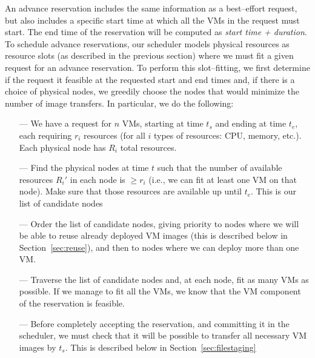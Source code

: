 An advance reservation includes the same information as a best--effort request, but also includes a specific start time at which all the VMs in the request must start. The end time of the reservation will be computed as \emph{start time + duration}. To schedule advance reservations, our scheduler models physical resources as resource slots (as described in the previous section) where we must fit a given request for an advance reservation. To perform this slot--fitting, we first determine if the request it feasible at the requested start and end times and, if there is a choice of physical nodes, we greedily choose the nodes that would minimize the number of image transfers. In particular, we do the following:

\begin{itemize}
\item[---] We have a request for $n$ VMs, starting at time $t_s$ and ending at time $t_e$, each requiring $r_i$ resources (for all $i$ types of resources: CPU, memory, etc.). Each physical node has $R_i$ total resources.
\item[---] Find the physical nodes at time $t$ such that the number of available resources $R_i'$ in each node is $\geqslant r_i$ (i.e., we can fit at least one VM on that node). Make sure that those resources are available up until $t_e$. This is our list of candidate nodes
\item[---] Order the list of candidate nodes, giving priority to nodes where we will be able to reuse already deployed VM images (this is described below in Section~\ref{sec:reuse}), and then to nodes where we can deploy more than one VM. 
\item[---] Traverse the list of candidate nodes and, at each node, fit as many VMs as possible. If we manage to fit all the VMs, we know that the VM component of the reservation is feasible.
\item[---] Before completely accepting the reservation, and committing it in the scheduler, we must check that it will be possible to transfer all necessary VM images by $t_s$. This is described below in Section~\ref{sec:filestaging}
\end{itemize}

